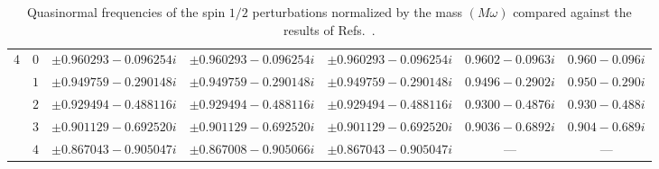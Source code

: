 \begin{table}[ht]
{\begin{tabular}{l |c|c|c|c|c|c}
      4   & $0$ & $\pm 0.960293 -0.096254 i$                & $\pm 0.960293 -0.096254 i$                 & $\pm 0.960293 -0.096254 i$ & $0.9602-0.0963 i$      & $0.960 -0.096i$        \\
          & $1$ & $\pm 0.949759 -0.290148 i$                & $\pm 0.949759 -0.290148 i$                 & $\pm 0.949759 -0.290148 i$ & $0.9496-0.2902 i$      & $0.950 -0.290i$        \\
          & $2$ & $\pm 0.929494 -0.488116 i$                & $\pm 0.929494 -0.488116 i$                 & $\pm 0.929494 -0.488116 i$ & $0.9300-0.4876 i$      & $0.930 -0.488i$        \\
          & $3$ & $\pm 0.901129 -0.692520 i$                & $\pm 0.901129 -0.692520 i$                 & $\pm 0.901129 -0.692520 i$ & $0.9036-0.6892 i$      & $0.904 -0.689i$        \\
          & $4$ & $\pm 0.867043 -0.905047 i$                & $\pm 0.867008 -0.905066 i$                 & $\pm 0.867043 -0.905047 i$ & ---                    & ---                    \\
      \hline\hline
    \end{tabular}
  }
  \caption{
    Quasinormal frequencies of the spin $1/2$ perturbations normalized by the mass $(M\omega)$ compared against the results of Refs.~\cite{Cho:2003qe, Shu:2005fw}.
  }
  \label{Tab:Spin1/2}
\end{table}

\begin{table}[ht]
  \centering
  \caption{
    Purely imaginary frequencies for spin $1/2$ perturbations normalized by the mass $(M\omega)$. The numerical values of such frequencies are exactly the same as for the purely imaginary frequencies arising in the QNM of spin 3/2 perturbations.
  }
  \label{Tab:PurelyImSpin3/2}
\end{table}

